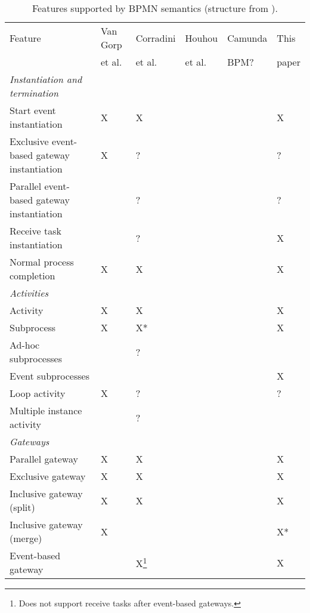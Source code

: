 \documentclass[adraft, copyright, creativecommons]{eptcs} %
\begin{document}
\begin{table}[h]

    \caption{Features supported by BPMN semantics (structure from \cite{vangorpVisualTokenbasedFormalization2013}).}
    \label{tab:supportedFeatures}
    \begin{tabular}{l l l l l l} %
    \hline
      Feature & Van Gorp &  Corradini & Houhou & Camunda & This\\
      & et al. \cite{vangorpVisualTokenbasedFormalization2013} & et al. \cite{corradiniFormalApproachAnalysis2021}& et al. \cite{houhouFirstOrderLogicSemantics2019} & BPM? & paper\\
      \hline
      \textit{Instantiation and termination} & & &\\
      Start event instantiation & X & X & & & X\\
      Exclusive event-based gateway instantiation & X & ? & & & ?\\
      Parallel event-based gateway instantiation &  & ? & & & ?\\
      Receive task instantiation &  & ? & & & X\\
      Normal process completion & X & X & & & X\\
      \textit{Activities} & & & & &\\
      Activity & X & X & & & X\\
      Subprocess & X & X* & & & X\\
      Ad-hoc subprocesses &  & ? & & &\\
      Event subprocesses & & & &  & \color{yellow}X\\ %
      Loop activity & X & ? & & & ?\\
      Multiple instance activity &  & ? & & & \\
      \textit{Gateways} & & & & &\\
      Parallel gateway & X & X & & & X\\
      Exclusive gateway & X & X & & & X\\
      Inclusive gateway (split) & X & X & & & X\\
      Inclusive gateway (merge) & X & & & & X*\\
      Event-based gateway &  & X\footnote{Does not support receive tasks after event-based gateways.} & & & X\\

\end{tabular}
\end{table}
\end{document}
